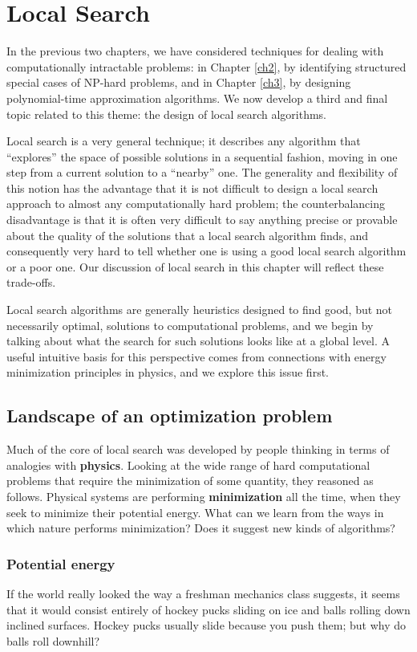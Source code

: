 \section{Local Search}
In the previous two chapters, we have considered techniques for dealing with computationally intractable problems: in Chapter \ref{ch2}, by identifying structured special cases of NP-hard problems, and in Chapter \ref{ch3}, by designing polynomial-time approximation algorithms. We now develop a third and final topic related to this theme: the design of local search algorithms. 

Local search is a very general technique; it describes any algorithm that “explores” the space of possible solutions in a sequential fashion, moving in one step from a current solution to a “nearby” one. The generality and flexibility of this notion has the advantage that it is not difficult to design a local search approach to almost any computationally hard problem; the counterbalancing disadvantage is that it is often very difficult to say anything precise or provable about the quality of the solutions that a local search algorithm finds, and consequently very hard to tell whether one is using a good local search algorithm or a poor one. Our discussion of local search in this chapter will reflect these trade-offs.

Local search algorithms are generally heuristics designed to find good, but not necessarily optimal, solutions to computational problems, and we begin by talking about what the search for such solutions looks like at a global level. A useful intuitive basis for this perspective comes from connections with energy minimization principles in physics, and we explore this issue first.

\subsection{Landscape of an optimization problem}
Much of the core of local search was developed by people thinking in terms of analogies with \textbf{physics}. Looking at the wide range of hard computational problems that require the minimization of some quantity, they reasoned as follows. Physical systems are performing \textbf{minimization} all the time, when they seek to minimize their potential energy. What can we learn from the ways in which nature performs minimization? Does it suggest new kinds of algorithms?

\subsubsection{Potential energy} 
If the world really looked the way a freshman mechanics class suggests, it seems that it would consist entirely of hockey pucks sliding on ice and balls rolling down inclined surfaces. Hockey pucks usually slide because you push them; but why do balls roll downhill?

